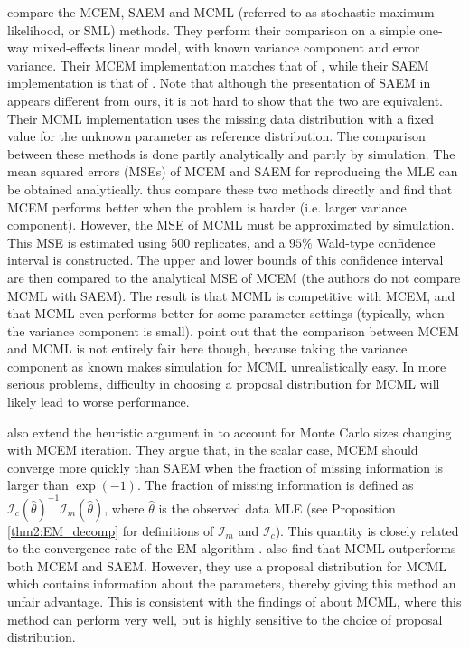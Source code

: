 \documentclass[11pt, oneside]{article}   	%
\begin{document}
\citet{Boo01} compare the MCEM, SAEM and MCML (referred to as stochastic maximum likelihood, or SML) methods. They perform their comparison on a simple one-way mixed-effects linear model, with known variance component and error variance. Their MCEM implementation matches that of \citet{Boo99}, while their SAEM implementation is that of \citealp{Del99}. Note that although the presentation of SAEM in \citeauthor{Boo01} appears different from ours, it is not hard to show that the two are equivalent. Their MCML implementation uses the missing data distribution with a fixed value for the unknown parameter as reference distribution. The comparison between these methods is done partly analytically and partly by simulation. The mean squared errors (MSEs) of MCEM and SAEM for reproducing the MLE can be obtained analytically. \citeauthor{Boo01} thus compare these two methods directly and find that MCEM performs better when the problem is harder (i.e. larger variance component). However, the MSE of MCML must be approximated by simulation. This MSE is estimated using 500 replicates, and a $95\%$ Wald-type confidence interval is constructed. The upper and lower bounds of this confidence interval are then compared to the analytical MSE of MCEM (the authors do not compare MCML with SAEM). The result is that MCML is competitive with MCEM, and that MCML even performs better for some parameter settings (typically, when the variance component is small). \citeauthor{Boo01} point out that the comparison between MCEM and MCML is not entirely fair here though, because taking the variance component as known makes simulation for MCML unrealistically easy. In more serious problems, difficulty in choosing a proposal distribution for MCML will likely lead to worse performance.


\citet{Boo01} also extend the heuristic argument in \citet{Gu98I} to account for Monte Carlo sizes changing with MCEM iteration. They argue that, in the scalar case, MCEM should converge more quickly than SAEM when the fraction of missing information is larger than $\exp(-1)$. The fraction of missing information is defined as $\mathcal{I}_c(\hat{\theta})^{-1} \mathcal{I}_m(\hat{\theta})$, where $\hat{\theta}$ is the observed data MLE (see Proposition \ref{thm2:EM_decomp} for definitions of $\mathcal{I}_m$ and $\mathcal{I}_c$). This quantity is closely related to the convergence rate of the EM algorithm \citep{Men94,McL08}. \citeauthor{Boo01} also find that MCML outperforms both MCEM and SAEM. However, they use a proposal distribution for MCML which contains information about the parameters, thereby giving this method an unfair advantage. This is consistent with the findings of \citet{McC97} about MCML, where this method can perform very well, but is highly sensitive to the choice of proposal distribution.
\end{document}
